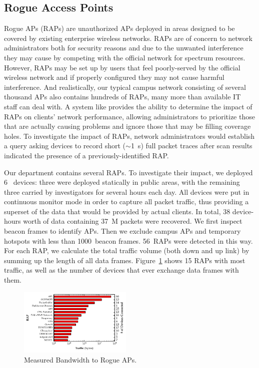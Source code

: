 \subsection{Rogue Access Points}
\label{subsec-rogue}

Rogue APs (RAPs) are unauthorized APs deployed in areas designed to be
covered by existing enterprise wireless networks. RAPs are of concern to
network administrators both for security reasons and due to the unwanted
interference they may cause by competing with the official network for
spectrum resources. However, RAPs may be set up by users that feel
poorly-served by the official wireless network and if properly configured
they may not cause harmful interference. And realistically, our typical
campus network consisting of several thousand APs also contains hundreds of
RAPs, many more than available IT staff can deal with. A system like
\PS{} provides the ability to determine the impact of RAPs on clients'
network performance, allowing administrators to prioritize those that are
actually causing problems and ignore those that may be filling coverage
holes. To investigate the impact of RAPs, network administrators would
establish a \PS{} query asking devices to record short ($\sim$1~s) full packet
traces after scan results indicated the presence of a previously-identified
RAP.

Our department contains several RAPs. To investigate their impact, we
deployed 6~\PS{} devices: three were deployed statically in public areas,
with the remaining three carried by investigators for several hours each day.
All devices were put in continuous monitor mode in order to capture all
packet traffic, thus providing a superset of the data that would be provided
by actual \PS{} clients. In total, 38 device-hours worth of data containing
37~M packets were recovered. We first inspect beacon frames to identify APs.
Then we exclude campus APs and temporary hotspots with less than 1000~beacon
frames. 56~RAPs were detected in this way. For each RAP, we calculate the
total traffic volume (both down and up link) by summing up the length of all
data frames. Figure~\ref{fig:rap} shows 15 RAPs with most traffic, as well as
the number of devices that ever exchange data frames with them.


\begin{figure}[t!]
  \centering
  \includegraphics[width=0.48\textwidth]{./figures/RAPTrafficGraph.pdf}
  \vspace*{-0.1in}
  \caption{Measured Bandwidth to Rogue APs.}
  \label{fig:rap}
  \vspace*{-0.1in}
\end{figure}

